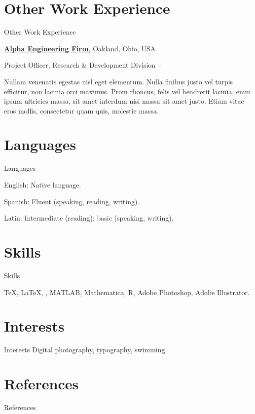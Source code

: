 \documentclass[a4paper,10pt,oneside]{article}
\begin{document}
\begin{body}

\section{Other Work Experience}
{Other Work Experience}

\href{http://www.example.com/my-company}
{\textbf{Alpha Engineering Firm}},
Oakland, Ohio, USA
\par
Project Officer,
Research \& Development Division
\hfill
{} --
\begin{detail}
Nullam venenatis egestas nisl eget elementum. Nulla finibus justo vel turpis efficitur, non lacinia orci maximus. Proin rhoncus, felis vel hendrerit lacinia, enim ipsum ultricies massa, sit amet interdum nisi massa sit amet justo. Etiam vitae eros mollis, consectetur quam quis, molestie massa.
\end{detail}


\section{Languages}
{Languages}

English: Native language.
\par
Spanish: Fluent (speaking, reading, writing).
\par
Latin: Intermediate (reading); basic (speaking, writing).



\section{Skills}
{Skills}

{\TeX}, {\LaTeX}, {\XeLaTeX},
MATLAB,
Mathematica,
R,
Adobe Photoshop,
Adobe Illustrator.


\section{Interests}
{Interests}
Digital photography,
typography,
swimming.


\section{References}
{References}


\end{body}
\end{document}
